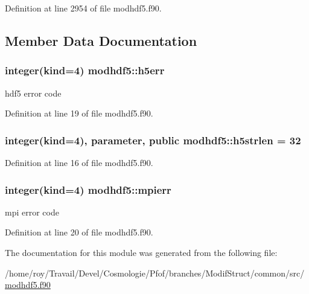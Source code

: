 Definition at line 2954 of file modhdf5.\-f90.



\subsection{Member Data Documentation}
\hypertarget{classmodhdf5_a7c21e772a564aec00e44e46562e9e840}{
\subsubsection[{h5err}]{\setlength{\rightskip}{0pt plus 5cm}integer(kind=4) modhdf5\-::h5err\hspace{0.3cm}{\ttfamily [private]}}}\label{classmodhdf5_a7c21e772a564aec00e44e46562e9e840}


hdf5 error code 



Definition at line 19 of file modhdf5.\-f90.

\hypertarget{classmodhdf5_a74fed11716b5063ece33a584a5872f7a}{
\subsubsection[{h5strlen}]{\setlength{\rightskip}{0pt plus 5cm}integer(kind=4), parameter, public modhdf5\-::h5strlen = 32}}\label{classmodhdf5_a74fed11716b5063ece33a584a5872f7a}


Definition at line 16 of file modhdf5.\-f90.

\hypertarget{classmodhdf5_a8d55ad41fc659457afec426d7eb3b2e8}{
\subsubsection[{mpierr}]{\setlength{\rightskip}{0pt plus 5cm}integer(kind=4) modhdf5\-::mpierr\hspace{0.3cm}{\ttfamily [private]}}}\label{classmodhdf5_a8d55ad41fc659457afec426d7eb3b2e8}


mpi error code 



Definition at line 20 of file modhdf5.\-f90.



The documentation for this module was generated from the following file\-:\begin{DoxyCompactItemize}
\item 
/home/roy/\-Travail/\-Devel/\-Cosmologie/\-Pfof/branches/\-Modif\-Struct/common/src/\hyperlink{modhdf5_8f90}{modhdf5.\-f90}\end{DoxyCompactItemize}
